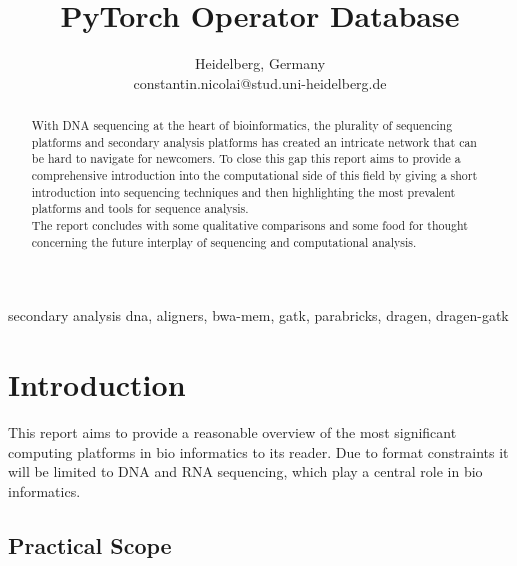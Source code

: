 \documentclass[conference]{IEEEtran}
\begin{document}
\title{PyTorch Operator Database}

\author{
Heidelberg, Germany \\
constantin.nicolai@stud.uni-heidelberg.de}


\maketitle

\begin{abstract}
With DNA sequencing at the heart of bioinformatics, the plurality of sequencing platforms and secondary analysis platforms has created an intricate network that can be hard to navigate for newcomers. To close this gap this report aims to provide a comprehensive introduction into the computational side of this field by giving a short introduction into sequencing techniques and then highlighting the most prevalent platforms and tools for sequence analysis. \\
The report concludes with some qualitative comparisons and some food for thought concerning the future interplay of sequencing and computational analysis.
\end{abstract}

\begin{IEEEkeywords}
secondary analysis dna, aligners, bwa-mem, gatk, parabricks, dragen, dragen-gatk
\end{IEEEkeywords}

\section{Introduction}
This report aims to provide a reasonable overview of the most significant computing platforms in bio informatics to its reader. Due to format constraints it will be limited to DNA and RNA sequencing, which play a central role in bio informatics. 


\subsection{Practical Scope}
\end{document}
